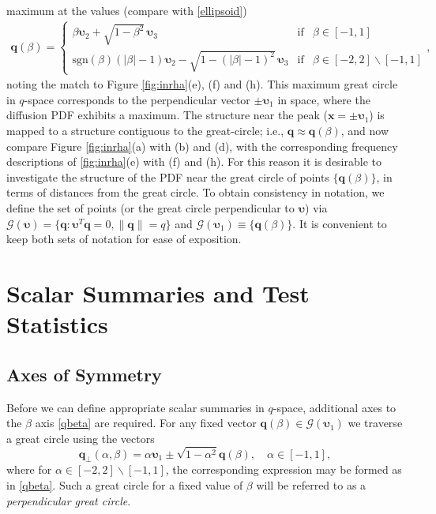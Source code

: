 \documentclass[dvips,aoas,preprint]{imsart}
\numberwithin{equation}{section}
\theoremstyle{plain}
\newcommand{\q}{\mathbf{q}}
\newcommand{\bu}{\bs{\upsilon}}
\newcommand{\x}{\mathbf{x}}
\newcommand{\cG}{\mathcal{G}}
\newcommand{\bs}[1]{\boldsymbol{#1}}
\begin{document}
maximum at the values (compare with \eqref{ellipsoid})
\begin{eqnarray}\label{qbeta}
  \q(\beta) = \left\{
  \begin{array}{lcr}
    \beta \bu_2+\sqrt{1-\beta^2}\,\bu_3 & \text{if} & \beta\in[-1,1]\\
    \text{sgn} \left(\beta\right) (|\beta|-1)\bu_2 -
    \sqrt{1-(|\beta|-1)^2}\,  \bu_3 & \text{if} &
    \beta\in[-2,2]\backslash[-1,1]
  \end{array} \right. ,
\end{eqnarray}
noting the match to Figure \ref{fig:inrha}(e), (f) and (h).  This
maximum great circle in $q$-space corresponds to the perpendicular
vector $\pm\bu_1$ in space, where the diffusion PDF exhibits a
maximum.  The structure near the peak ($\x=\pm\bu_1$) is mapped to a
structure contiguous to the great-circle; i.e., $\q\approx\q(\beta)$,
and now compare Figure \ref{fig:inrha}(a) with (b) and (d), with the
corresponding frequency descriptions of \ref{fig:inrha}(e) with (f)
and (h).  For this reason it is desirable to investigate the structure
of the PDF near the great circle of points $\{\q(\beta)\}$, in terms
of distances from the great circle.  To obtain consistency in
notation, we define the set of points (or the great circle
perpendicular to $\bu$) via $\cG(\bu)=\{\q:\bu^T\q=0,\|\q\|=q\}$ and
$\cG(\bu_1)\equiv\{\q(\beta)\}$.  It is convenient to keep both sets
of notation for ease of exposition.

\section{Scalar Summaries and Test Statistics}

\subsection{Axes of Symmetry}

Before we can define appropriate scalar summaries in $q$-space,
additional axes to the $\beta$ axis \eqref{qbeta} are required.  For
any fixed vector $\q(\beta)\in\cG(\bu_1)$ we traverse a great circle
using the vectors
\begin{equation}\label{alphabetaplane}
  \q_\perp(\alpha,\beta) = \alpha\bu_1\pm\sqrt{1-\alpha^2}\q(\beta),
  \quad \alpha \in [-1,1],
\end{equation}
where for $\alpha\in\left[-2,2\right]\backslash[-1,1]$, the
corresponding expression may be formed as in \eqref{qbeta}.  Such a
great circle for a fixed value of $\beta$ will be referred to as a
{\em perpendicular great circle}.
\end{document}

